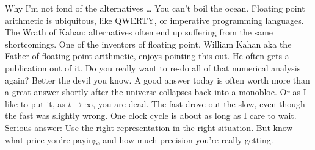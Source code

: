 \documentclass{beamer}
\begin{document}
\begin{frame}{Why I'm not fond of the alternatives \ldots}
You can't boil the ocean. Floating point arithmetic is ubiquitous, like QWERTY, or imperative programming
languages.
The Wrath of Kahan: alternatives often end up suffering from the same shortcomings. One of the inventors of
floating point, William Kahan aka the Father of floating point arithmetic, enjoys pointing this out. He often gets a publication out of it.
Do you really want to re-do all of that numerical analysis again? Better the devil you know.
A good answer today is often worth more than a great answer shortly after the universe collapses back into a 
monobloc. Or as I like to put it, as $t \to \infty$, you are dead.
The fast drove out the slow, even though the fast was slightly wrong.
One clock cycle is about as long as I care to wait.
Serious answer: Use the right representation in the right situation. But know what price you're paying, and
how much precision you're really getting.
\end{frame}

\end{document}
